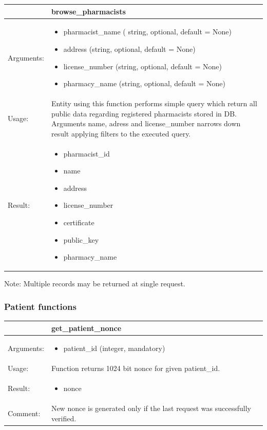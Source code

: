 \begin{table}[h]
    \begin{tabular}{| p{6cm} | p{7.75cm} |}
    \hline
     & browse\_pharmacists \\ \hline
    Arguments: &  \begin{itemize}
    	\item pharmacist\_name ( string, optional, default = None)
		\item address (string, optional, default = None)
		\item license\_number (string, optional, default = None)
		\item pharmacy\_name (string, optional, default = None)

	\end{itemize}     \\ \hline
    Usage: & Entity using this function performs simple query which return all public data regarding registered pharmacists stored in DB. Arguments name, adress and license\_number narrows down result applying filters to the executed query. \\ \hline
    Result: & \begin{itemize}
    	\item pharmacist\_id
		\item name
		\item address
		\item license\_number
		\item certificate
		\item public\_key
		\item pharmacy\_name
	\end{itemize}     \\ \hline	
    \end{tabular}
\end{table}Note: Multiple records may be returned at single request.

\subsubsection{Patient functions}

\begin{table}[h]
    \begin{tabular}{| p{6cm} | p{7.75cm} |}
    \hline
     & get\_patient\_nonce \\ \hline
    Arguments: &  \begin{itemize}
    	\item patient\_id (integer, mandatory)
	\end{itemize}     \\ \hline
    Usage: & Function returns 1024 bit nonce for given patient\_id. \\ \hline
    Result: & \begin{itemize}
    	\item nonce
	\end{itemize}     \\ \hline	
			Comment: & New nonce is generated only if the last request was successfully verified.\\ \hline
    \end{tabular}
\end{table}

